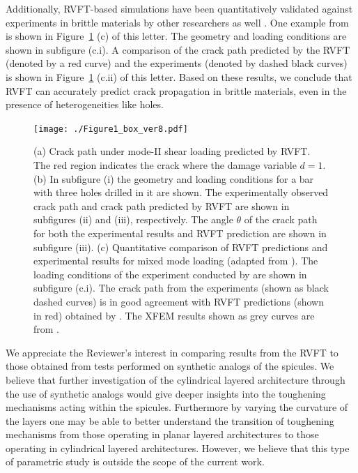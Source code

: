 \documentclass[11pt,letterpaper]{report}
\begin{document}
\begin{enumerate}[label=\textit{2.\arabic*},wide, labelwidth=!, labelindent=0pt]
Additionally, RVFT-based simulations have been quantitatively validated against experiments in brittle materials by other researchers as well \cite{mesgarnejad2015validation}. One example from \cite{mesgarnejad2015validation} is shown in Figure~\ref{Fig4} (c) of this letter. The geometry and loading conditions are shown in subfigure (c.i). A comparison of the crack path predicted by the RVFT (denoted by a red curve) and the experiments (denoted by dashed black curves) is shown in Figure~\ref{Fig4} (c.ii) of this letter. Based on these results, we conclude that RVFT can accurately predict crack propagation in brittle materials, even in the presence of heterogeneities like holes.

\begin{figure}[hb!]
	\centering
	\texttt{[image: ./Figure1\_box\_ver8.pdf]}
	\caption{(a) Crack path under mode-II shear loading predicted by RVFT. The red region indicates the crack where the damage variable $d=1$. (b) In subfigure (i) the geometry and loading conditions for a bar with three holes drilled in it are shown. The experimentally observed crack path and crack path predicted by RVFT are shown in subfigures (ii) and (iii), respectively. The angle $\theta$ of the crack path for both the experimental results and RVFT prediction are shown in subfigure (iii). (c) Quantitative comparison of RVFT predictions and experimental results for mixed mode loading (adapted from \cite{mesgarnejad2015validation}). The loading conditions of the experiment conducted by \cite{nooru1992mixed} are shown in subfigure (c.i). The crack path from the experiments (shown as black dashed curves) is in good agreement with RVFT predictions (shown in red) obtained by \cite{mesgarnejad2015validation}. The XFEM results shown as grey curves are from \cite{bobinski2014constitutive}.}
	\label{Fig4}
\end{figure}


We appreciate the Reviewer's interest in comparing results from the RVFT to those obtained from tests performed on synthetic analogs of the spicules. We believe that further investigation of the cylindrical layered architecture through the use of synthetic analogs would give deeper insights into the toughening mechanisms acting within the spicules. Furthermore by varying the curvature of the layers one may be able to better understand the transition of toughening mechanisms from those operating in planar layered architectures to those operating in cylindrical layered architectures. However, we believe that this type of parametric study is outside the scope of the current work.


\end{enumerate}
\end{document}
